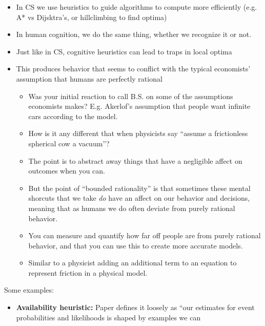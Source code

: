 \documentclass[11pt]{article}
\begin{document}
\begin{itemize}
    \item In CS we use heuristics to guide algorithms to compute more efficiently (e.g. A* vs Dijsktra's, or hillclimbing to find optima)
    \item In human cognition, we do the same thing, whether we recognize it or not. 
    \item Just like in CS, cognitive heuristics can lead to traps in local optima
    \item This produces behavior that seems to conflict with the typical economists' assumption that humans are perfectly rational
    \begin{itemize}
        \item Was your initial reaction to call B.S. on some of the assumptions economists makes? E.g. Akerlof's assumption that people want infinite cars according to the model.
        \item How is it any different that when physicists say ``assume a frictionless spherical cow a vacuum''?
        \item The point is to abstract away things that have a negligible affect on outcomes when you can.
        \item But the point of ``bounded rationality'' is that sometimes these mental shorcuts that we take \textit{do} have an affect on our behavior and decisions, meaning that as humans we do often deviate from purely rational behavior.
        \item You can measure and quantify how far off people are from purely rational behavior, and that you can use this to create more accurate models.
        \item Similar to a physicist adding an additional term to an equation to represent friction in a physical model.
    \end{itemize}
\end{itemize}

Some examples:
\begin{itemize}
    \item {\bf Availability heuristic:} Paper defines it loosely as ``our estimates for event probabilities and likelihoods is shaped by examples we can 
\end{itemize}


\end{document}
